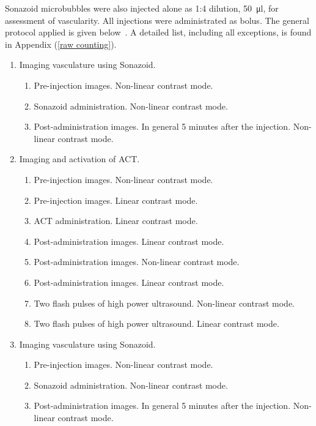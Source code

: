 Sonazoid\texttrademark{} microbubbles were also injected alone as 1:4 dilution, \SI{50}{\micro\litre}, for assessment of vascularity. All injections were administrated as bolus. The general protocol applied is given below~\cite{Healey2014}. A detailed list, including all exceptions, is found in Appendix (\ref{raw counting}).
\FloatBarrier
\begin{enumerate}
	\item Imaging vasculature using Sonazoid\texttrademark{}.
		\begin{enumerate}
		\item Pre-injection images. Non-linear contrast mode.
		\item Sonazoid\texttrademark{} administration. Non-linear contrast mode.
		\item Post-administration images. In general 5 minutes after the injection. Non-linear contrast mode.
		\end{enumerate}
	\item Imaging and activation of ACT\texttrademark{}.
		\begin{enumerate}
		\item Pre-injection images. Non-linear contrast mode.
		\item Pre-injection images. Linear contrast mode.
		\item ACT\texttrademark{} administration. Linear contrast mode.
		\item Post-administration images. Linear contrast mode.
		\item Post-administration images. Non-linear contrast mode.
		\item Post-administration images. Linear contrast mode.
		\item Two flash pulses of high power ultrasound. Non-linear contrast mode.
		\item Two flash pulses of high power ultrasound. Linear contrast mode.
		\end{enumerate}
	\item Imaging vasculature using Sonazoid\texttrademark{}.
		\begin{enumerate}
		\item Pre-injection images. Non-linear contrast mode.
		\item Sonazoid\texttrademark{} administration. Non-linear contrast mode.
		\item Post-administration images. In general 5 minutes after the injection. Non-linear contrast mode.
		\end{enumerate}
\end{enumerate}  
 

